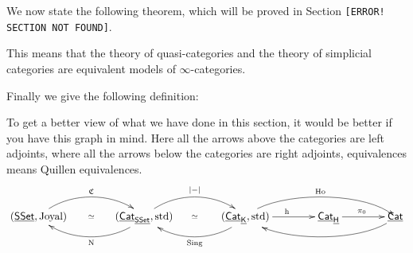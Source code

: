 We now state the following theorem, which will be proved in Section \texttt{\color{ff0000}[ERROR! SECTION NOT FOUND]}.


This means that the theory of quasi-categories and the theory of simplicial categories are equivalent models of $\infty$-categories.

Finally we give the following definition:


To get a better view of what we have done in this section, it would be better if you have this graph in mind. Here all the arrows
above the categories are left adjoints, where all the arrows below the categories are right adjoints, equivalences
means Quillen equivalences.
$$\xymatrix @C=40pt{
    (\cat{SSet},\text{Joyal})\ar@(ru,lu)[r]^{\C}\ar@{}[r]|{\simeq}
    &(\cat{Cat}_{\cat{SSet}},\text{std})\ar@(ld,rd)[l]^{\N}\ar@(ru,lu)[r]^{\abs-}\ar@{}[r]|{\simeq}
    &(\cat{Cat}_{\cat{K}},\text{std})\ar@(ld,rd)[l]^{\Sing}\ar[r]^{\h}\ar@(ru,lu)[rr]^{\Ho}
    &\cat{Cat}_{\cat H}\ar[r]^{\pi_0}
    &\cat{Cat}\ar@(ld,rd)[ll]
}$$